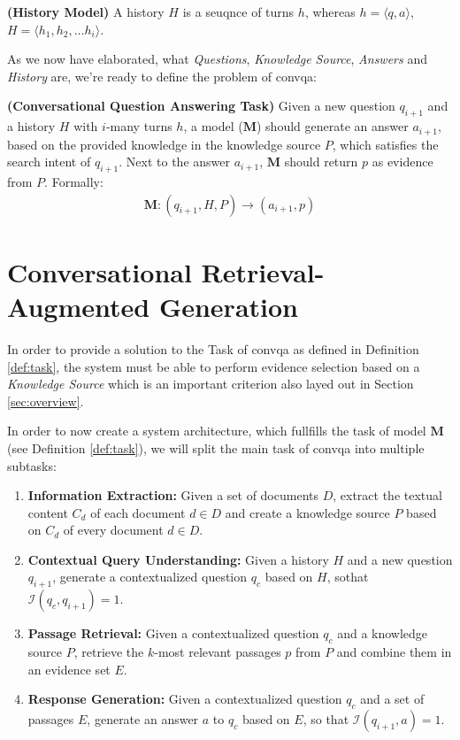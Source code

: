 \begin{definition}
    \textbf{(History Model)} A history $H$ is a seuqnce of turns $h$, whereas $h = \langle q,a\rangle$, $H = \langle h_1, h_2, \dots h_i\rangle$.
    \label{def:history_model}
\end{definition}

As we now have elaborated, what \textit{Questions}, \textit{Knowledge Source}, \textit{Answers} and \textit{History} are, we're ready to define the problem of \gls{convqa}:

\begin{definition}
    \textbf{(Conversational Question Answering Task)} Given a new question $q_{i+1}$ and a history $H$ with $i$-many turns $h$, a model ($\mathbf{M}$) should generate an answer $a_{i+1}$, based on the provided knowledge in the knowledge source $P$, which satisfies the search intent of $q_{i+1}$. Next to the answer $a_{i+1}$, $\mathbf{M}$ should return $p$ as evidence from $P$. Formally:
    \begin{align*}
        \mathbf{M}: (q_{i+1}, H, P) \rightarrow (a_{i+1}, p)
    \end{align*}
    \label{def:task}
\end{definition}

\section{Conversational Retrieval-Augmented Generation}
\label{sec:conrag}

In order to provide a solution to the Task of \gls{convqa} as defined in Definition \ref{def:task}, the system must be able to perform evidence selection based on a \textit{Knowledge Source} which is an important criterion also layed out in Section \ref{sec:overview}. 

In order to now create a system architecture, which fullfills the task of model $\mathbf{M}$ (see Definition \ref{def:task}), we will split the main task of \gls{convqa} into multiple subtasks:

\begin{enumerate}
    \item \textbf{Information Extraction:} Given a set of documents $D$, extract the textual content $C_d$ of each document $d \in D$ and create a knowledge source $P$ based on $C_d$ of every document $d \in D$.
    \item \textbf{Contextual Query Understanding:} Given a history $H$ and a new question $q_{i+1}$, generate a contextualized question $q_c$ based on $H$, sothat $\mathcal{I}(q_c,q_{i+1}) = 1$.
    \item \textbf{Passage Retrieval:} Given a contextualized question $q_c$ and a knowledge source $P$, retrieve the $k$-most relevant passages $p$ from $P$ and combine them in an evidence set $E$.
    \item \textbf{Response Generation:} Given a contextualized question $q_c$ and a set of passages $E$, generate an answer $a$ to $q_c$ based on $E$, so that $\mathcal{I}(q_{i+1},a) = 1$.
\end{enumerate}

